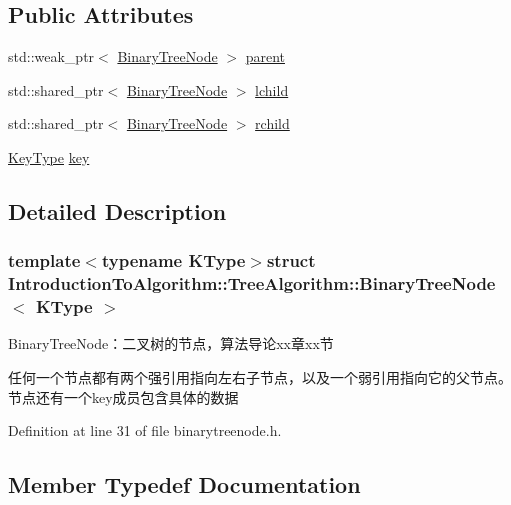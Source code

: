 \subsection*{Public Attributes}
\begin{DoxyCompactItemize}
\item 
std\+::weak\+\_\+ptr$<$ \hyperlink{struct_introduction_to_algorithm_1_1_tree_algorithm_1_1_binary_tree_node}{Binary\+Tree\+Node} $>$ \hyperlink{struct_introduction_to_algorithm_1_1_tree_algorithm_1_1_binary_tree_node_aa94cbc785416ba74505661baac55a9fd}{parent}
\item 
std\+::shared\+\_\+ptr$<$ \hyperlink{struct_introduction_to_algorithm_1_1_tree_algorithm_1_1_binary_tree_node}{Binary\+Tree\+Node} $>$ \hyperlink{struct_introduction_to_algorithm_1_1_tree_algorithm_1_1_binary_tree_node_a3e056b1d34820497ac3a23a16180be2b}{lchild}
\item 
std\+::shared\+\_\+ptr$<$ \hyperlink{struct_introduction_to_algorithm_1_1_tree_algorithm_1_1_binary_tree_node}{Binary\+Tree\+Node} $>$ \hyperlink{struct_introduction_to_algorithm_1_1_tree_algorithm_1_1_binary_tree_node_aaccc444db582ed362bff4e50efbc47c7}{rchild}
\item 
\hyperlink{struct_introduction_to_algorithm_1_1_tree_algorithm_1_1_binary_tree_node_adbd8539e7a907c3a8fe7a8b79e7032e8}{Key\+Type} \hyperlink{struct_introduction_to_algorithm_1_1_tree_algorithm_1_1_binary_tree_node_af3cb8030ab05ccaf1a69a86c9f468b8d}{key}
\end{DoxyCompactItemize}


\subsection{Detailed Description}
\subsubsection*{template$<$typename K\+Type$>$struct Introduction\+To\+Algorithm\+::\+Tree\+Algorithm\+::\+Binary\+Tree\+Node$<$ K\+Type $>$}

Binary\+Tree\+Node：二叉树的节点，算法导论xx章xx节 

任何一个节点都有两个强引用指向左右子节点，以及一个弱引用指向它的父节点。节点还有一个{\ttfamily key}成员包含具体的数据 

Definition at line 31 of file binarytreenode.\+h.



\subsection{Member Typedef Documentation}
\hypertarget{struct_introduction_to_algorithm_1_1_tree_algorithm_1_1_binary_tree_node_adbd8539e7a907c3a8fe7a8b79e7032e8}{}
